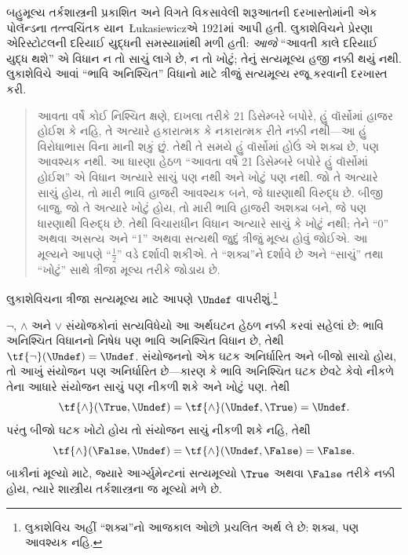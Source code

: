 \begingroup
\makeatletter{}\makeatother


\label{guunit:OLP-0394}


બહુમૂલ્ય તર્કશાસ્ત્રની પ્રકાશિત અને વિગતે વિકસાવેલી શરૂઆતની
દરખાસ્તોમાંની એક પોલૅન્ડના તત્ત્વચિંતક યાન~\L ukasiewiczએ
1921માં આપી હતી. લુકાશેવિચને પ્રેરણા એરિસ્ટોટલની દરિયાઈ યુદ્ધની
સમસ્યામાંથી મળી હતી: \emph{આજે} ``આવતી કાલે દરિયાઈ યુદ્ધ થશે'' એ
વિધાન ન તો સાચું લાગે છે, ન તો ખોટું; તેનું સત્યમૂલ્ય હજી નક્કી થયું
નથી. લુકાશેવિચે આવાં ``ભાવિ અનિશ્ચિત'' વિધાનો માટે ત્રીજું સત્યમૂલ્ય
રજૂ કરવાની દરખાસ્ત કરી.
\begin{quote}
આવતા વર્ષે કોઈ નિશ્ચિત ક્ષણે, દાખલા તરીકે 21 ડિસેમ્બરે બપોરે,
હું વૉર્સોમાં હાજર હોઈશ કે નહિ, તે અત્યારે હકારાત્મક કે નકારાત્મક
રીતે નક્કી નથી—આ હું વિરોધાભાસ વિના માની શકું છું. તેથી તે
સમયે હું વૉર્સોમાં હોઉં એ શક્ય છે, પણ આવશ્યક નથી. આ ધારણા હેઠળ
``આવતા વર્ષે 21 ડિસેમ્બરે બપોરે હું વૉર્સોમાં હોઈશ'' એ વિધાન અત્યારે
સાચું પણ નથી અને ખોટું પણ નથી. જો તે અત્યારે સાચું હોય, તો મારી
ભાવિ હાજરી આવશ્યક બને, જે ધારણાથી વિરુદ્ધ છે. બીજી બાજુ, જો તે
અત્યારે ખોટું હોય, તો મારી ભાવિ હાજરી અશક્ય બને, જે પણ ધારણાથી
વિરુદ્ધ છે. તેથી વિચારાધીન વિધાન અત્યારે સાચું કે ખોટું નથી; તેને
``0'' અથવા અસત્ય અને ``1'' અથવા સત્યથી જુદું ત્રીજું મૂલ્ય હોવું
જોઈએ. આ મૂલ્યને આપણે ``$\frac{1}{2}$'' વડે દર્શાવી શકીએ. તે
``શક્ય''ને દર્શાવે છે અને ``સાચું'' તથા ``ખોટું'' સાથે ત્રીજા મૂલ્ય
તરીકે જોડાય છે.
\end{quote}
લુકાશેવિચના ત્રીજા સત્યમૂલ્ય માટે આપણે $\Undef$ વાપરીશું.\footnote{લુકાશેવિચ
અહીં ``શક્ય''નો આજકાલ ઓછો પ્રચલિત અર્થ લે છે: શક્ય, પણ આવશ્યક નહિ.}

$\lnot$, $\land$ અને $\lor$ સંયોજકોનાં સત્યવિધેયો આ અર્થઘટન હેઠળ
નક્કી કરવાં સહેલાં છે: ભાવિ અનિશ્ચિત વિધાનનો નિષેધ પણ ભાવિ અનિશ્ચિત
વિધાન છે, તેથી $\tf{\lnot}(\Undef) = \Undef$. સંયોજનનો એક ઘટક
અનિર્ધારિત અને બીજો સાચો હોય, તો આખું સંયોજન પણ અનિર્ધારિત છે—કારણ
કે ભાવિ અનિશ્ચિત ઘટક છેવટે કેવો નીકળે તેના આધારે સંયોજન સાચું પણ
નીકળી શકે અને ખોટું પણ. તેથી \[
    \tf{\land}(\True, \Undef) =
\tf{\land}(\Undef, \True) =
\Undef.
\]
પરંતુ બીજો ઘટક ખોટો હોય તો સંયોજન સાચું નીકળી શકે નહિ, તેથી
\[\tf{\land}(\False, \Undef) =
\tf{\land}(\Undef, \False) = \False.\]
બાકીનાં મૂલ્યો માટે, જ્યારે આર્ગ્યુમેન્ટનાં સત્યમૂલ્યો $\True$
અથવા $\False$ તરીકે નક્કી હોય, ત્યારે શાસ્ત્રીય તર્કશાસ્ત્રના
જ મૂલ્યો મળે છે.

